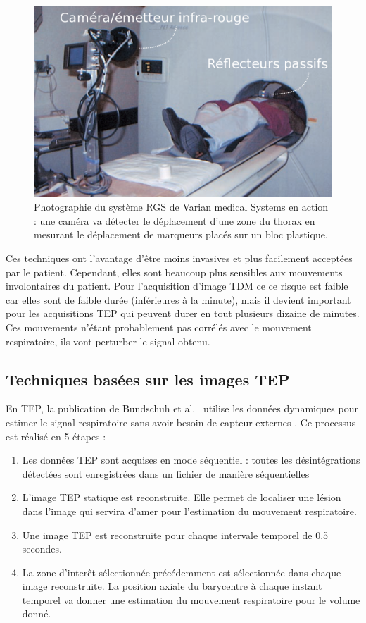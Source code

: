 \begin{figure}[h!]
	\begin{center}
		\includegraphics[width=12cm]{images/varian}
	\end{center}
	\caption{Photographie du système RGS de Varian medical Systems en action : une caméra va détecter le déplacement d'une zone du thorax en mesurant le déplacement de marqueurs placés sur un bloc plastique. } 
	\label{fig:RGSdeVarian}
\end{figure}

Ces techniques ont l'avantage d'être moins invasives et plus facilement acceptées par le patient. Cependant, elles sont beaucoup plus sensibles aux mouvements involontaires du patient. Pour l'acquisition d'image TDM ce ce risque est faible car elles sont de faible durée (inférieures à la minute), mais il devient important pour les acquisitions TEP qui peuvent durer en tout plusieurs dizaine de minutes. Ces mouvements n'étant probablement pas corrélés avec le mouvement respiratoire, ils vont perturber le signal obtenu. 

\subsection{Techniques basées sur les images TEP}
\label{lab:estimMvtTEP}
En TEP, la publication de Bundschuh et al.~\cite{bundschuh2007postacquisition} utilise les données dynamiques pour estimer le signal respiratoire sans avoir besoin de capteur externes . Ce processus est réalisé en 5 étapes : 

\begin{enumerate}
 \item Les données TEP sont acquises en mode séquentiel : toutes les désintégrations détectées sont enregistrées dans un fichier de manière séquentielles  
 \item L'image TEP statique est reconstruite. Elle permet de localiser une lésion dans l'image qui servira d'amer pour l'estimation du mouvement respiratoire.
 \item Une image TEP est reconstruite pour chaque intervale temporel de 0.5 secondes.
 \item La zone d'interêt sélectionnée précédemment est sélectionnée dans chaque image reconstruite. La position axiale du barycentre à chaque instant temporel va donner une estimation du mouvement respiratoire pour le volume donné.
\end{enumerate}

